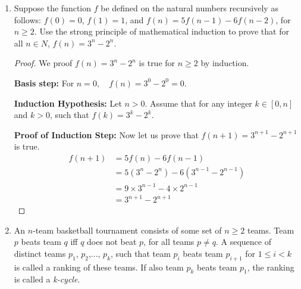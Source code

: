 \documentclass[12pt,a4paper]{article}
\theoremstyle{definition}
\begin{document}
\begin{enumerate}
\begin{proof}
    \textbf{Proof of Induction Step:} Define a new variable $m$,
   	\begin{equation}
	m=\left\{
	\begin{aligned}
	n-2 && i_n\neq 0  \\
	n-3 && i_n = 0 \\
	\end{aligned}
	\right.
	\end{equation}  
	Because $n\geq 10$, therefore $m\geq 7$ and $m<n$ and 
	\begin{equation}
	m\neq \left\{
	\begin{aligned}
	(i_n-1)\times 2+j_n\times 3 && i_n\neq 0 \\
	i_n\times 2+(j_n-1)\times 3 && i_n = 0 \\
	\end{aligned}
	\right.
	\end{equation}	 
	$i_n-1$ and $j_n-1$ can take arbitrary values in $\mathbb{N}$.
    \end{proof}

    \item
    Suppose the function $f$ be defined on the natural numbers recursively as follows: $f(0)=0$, $f(1)=1$, and $f(n)=5f(n-1)-6f(n-2)$, for $n\geq 2$. Use the strong principle of mathematical induction to prove that for all $n\in N$, $f(n)=3^n-2^n$. 
    \begin{proof}We proof $f(n)=3^n-2^n$ is true for $n\geq2$ by induction.  
    
        \textbf{Basis step:} For $n=0,\quad f(n)=3^0-2^0=0$.  
        
        \textbf{Induction Hypothesis:} Let $n>0$. Assume that for any integer $k \in [0,n]$ and $k>0$, such that $f(k)=3^k-2^k$.  
        
        \textbf{Proof of Induction Step:} Now let us prove that $f(n+1)=3^{n+1}-2^{n+1}$ is true.
        \begin{align}
       f(n+1) &=5f(n)-6f(n-1)\\
        & =5(3^{n}-2^{n})-6(3^{n-1}-2^{n-1})\\
        & =9\times 3^{n-1}-4\times 2^{n-1}\\
        & =3^{n+1}-2^{n+1}
        \end{align}
    \end{proof}

    \item
    An $n$-team basketball tournament consists of some set of $n\geq2$ teams. Team $p$ beats team $q$ iff $q$
does not beat $p$, for all teams $p\neq q$. A sequence of distinct teams $p_{1}$, $p_{2}$,..., $p_{k}$, such that team $p_{i}$ beats team $p_{i+1}$ for $1\leq i<k$ is called a ranking of these teams. If also team $p_{k}$ beats team $p_{1}$, the ranking is called a \emph{k-cycle}. 


\end{enumerate}
\end{document}
